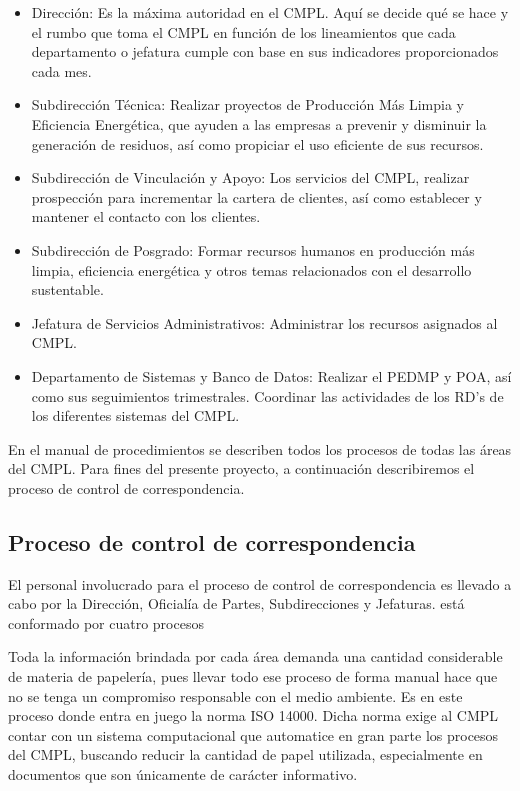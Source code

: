 	\begin{itemize}
		\item Dirección: Es la máxima autoridad en el CMPL. Aquí se decide qué se hace y el rumbo que toma el CMPL en función de los lineamientos que cada departamento o jefatura cumple con base en sus indicadores proporcionados cada mes.
		\item Subdirección Técnica: Realizar proyectos de Producción Más Limpia y Eficiencia Energética, que  ayuden a las empresas a prevenir y disminuir la generación de residuos, así como propiciar el uso eficiente de sus recursos.
		\item Subdirección de Vinculación y Apoyo: Los servicios del CMPL, realizar prospección para incrementar la cartera de clientes, así como establecer y mantener el contacto con los clientes.
		\item Subdirección de Posgrado: Formar recursos humanos en producción más limpia, eficiencia energética y otros temas relacionados con el desarrollo sustentable.
		\item Jefatura de Servicios Administrativos: Administrar los recursos asignados al CMPL.
		\item Departamento de Sistemas y Banco de Datos: Realizar el PEDMP y POA, así como sus seguimientos trimestrales. Coordinar las actividades de los RD's de los diferentes sistemas del CMPL.
	\end{itemize}
	
	En el manual de procedimientos se describen todos los procesos de todas las áreas del CMPL. Para fines del presente proyecto, a continuación describiremos el proceso de control de correspondencia.
	
	\subsection{Proceso de control de correspondencia}
	
	
	
	
	
	
	El personal involucrado para el proceso de control de correspondencia es llevado a cabo por la  Dirección, Oficialía de Partes, Subdirecciones y Jefaturas. está conformado por cuatro procesos 
	
	Toda la información brindada por cada área demanda una cantidad considerable de materia de papelería, pues llevar todo ese proceso de forma manual hace que no se tenga un compromiso responsable con el medio ambiente.  Es en este proceso donde entra en juego la norma ISO 14000. Dicha norma exige al CMPL contar con un sistema computacional que automatice en gran parte los procesos del CMPL, buscando reducir la cantidad de papel utilizada, especialmente en documentos que son únicamente de carácter informativo.\\
	
